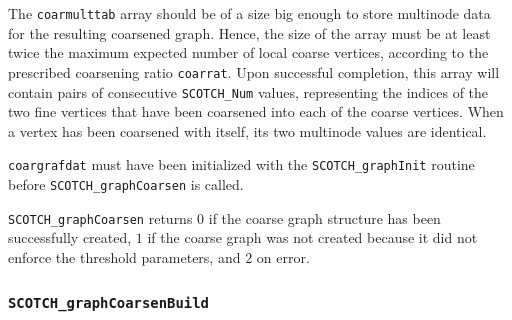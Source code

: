 \begin{itemize}
The {\tt coarmulttab} array should be of a size big enough to store
multinode data for the resulting coarsened graph. Hence, the size of
the array must be at least twice the maximum expected number of local
coarse vertices, according to the prescribed coarsening ratio
{\tt coarrat}. Upon successful completion, this array will contain
pairs of consecutive {\tt SCOTCH\_\lbt Num} values, representing the
indices of the two fine vertices that have been coarsened into each of
the coarse vertices. When a vertex has been coarsened with itself, its
two multinode values are identical.

{\tt coargrafdat} must have been initialized with the
{\tt SCOTCH\_\lbt graph\lbt Init} routine before
{\tt SCOTCH\_graph\lbt Coarsen} is called.

\progret

{\tt SCOTCH\_graphCoarsen} returns $0$ if the coarse graph
structure has been successfully created, $1$ if the coarse graph was
not created because it did not enforce the threshold parameters, and
$2$ on error.
\end{itemize}

\subsubsection{{\tt SCOTCH\_graphCoarsenBuild}}

